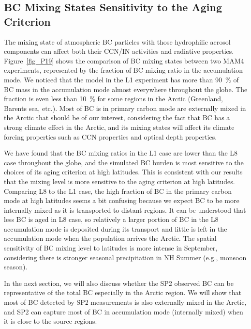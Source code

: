 \documentclass[12pt, fullpage]{uiucthesis2009}
\begin{document}
	\subsection{BC Mixing States Sensitivity to the Aging Criterion} 
	The mixing state of atmospheric BC particles with those hydrophilic aerosol components can affect both their CCN/IN activities and radiative properties. Figure~\ref{fig_P19} shows the comparison of BC mixing states between two MAM4 experiments, represented by the fraction of BC mixing ratio in the accumulation mode. We noticed that the model in the L1 experiment has more than 90~$\%$ of BC mass in the accumulation mode almost everywhere throughout the globe. The fraction is even less than 10~$\%$ for some regions in the Arctic (Greenland, Barents sea, etc.). Most of BC is in primary carbon mode are externally mixed in the Arctic that should be of our interest, considering the fact that BC has a strong climate effect in the Arctic, and its mixing states will affect its climate forcing properties such as CCN properties and optical depth properties.  
	
	We have found that the BC mixing ratios in the L1 case are lower than the L8 case throughout the globe, and the simulated BC burden is most sensitive to the choices of its aging criterion at high latitudes. This is consistent with our results that the mixing level is more sensitive to the aging criterion at high latitudes. Comparing L8 to the L1 case, the high fraction of BC in the primary carbon mode at high latitudes seems a bit confusing because we expect BC to be more internally mixed as it is transported to distant regions. It can be understood that less BC is aged in L8 case, so relatively a larger portion of BC in the L8 accumulation mode is deposited during its transport and little is left in the accumulation mode when the population arrives the Arctic. The spatial sensitivity of BC mixing level to latitudes is more intense in September, considering there is stronger seasonal precipitation in NH Summer (e.g., monsoon season). 
	
	In the next section, we will also discuss whether the SP2 observed BC can be representative of the total BC especially in the Arctic region. We will show that most of BC detected by SP2 measurements is also externally mixed in the Arctic, and SP2 can capture most of BC in accumulation mode (internally mixed) when it is close to the source regions.
	
\end{document}
